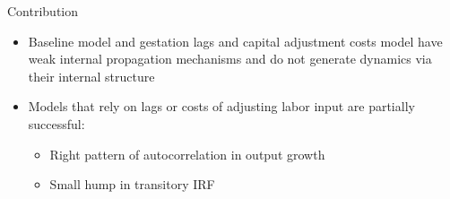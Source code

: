\documentclass[10pt]{beamer}
\begin{document}
\begin{frame}{Contribution}
    \begin{itemize}
        \item Baseline model and gestation lags and capital adjustment costs model have weak
              internal propagation mechanisms and do not generate dynamics via their internal
              structure
        \item Models that rely on lags or costs of adjusting labor input are partially
              successful:
              \begin{itemize}
                  \item Right pattern of autocorrelation in output growth
                  \item Small hump in transitory IRF
              \end{itemize}
    \end{itemize}

\end{frame}
\end{document}
